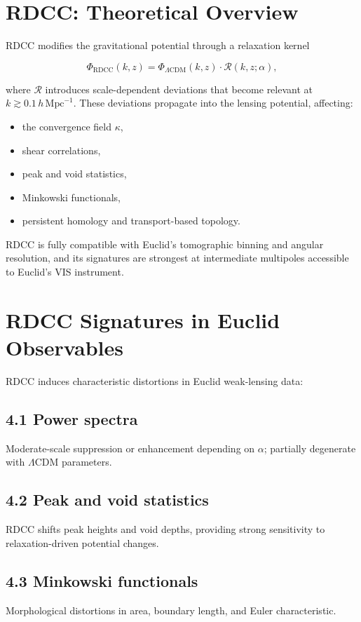 \documentclass[11pt,a4paper]{article}
\begin{document}
\section{RDCC: Theoretical Overview}

RDCC modifies the gravitational potential through a relaxation kernel


\[
    \Phi_{\mathrm{RDCC}}(k,z)
    =
    \Phi_{\Lambda\mathrm{CDM}}(k,z)
    \cdot
    \mathcal{R}(k,z;\alpha),
\]


where $\mathcal{R}$ introduces scale-dependent deviations that become relevant 
at $k \gtrsim 0.1\,h\,\mathrm{Mpc}^{-1}$. These deviations propagate into the 
lensing potential, affecting:

\begin{itemize}
    \item the convergence field $\kappa$,
    \item shear correlations,
    \item peak and void statistics,
    \item Minkowski functionals,
    \item persistent homology and transport-based topology.
\end{itemize}

RDCC is fully compatible with Euclid's tomographic binning and angular 
resolution, and its signatures are strongest at intermediate multipoles 
accessible to Euclid's VIS instrument.
\section{RDCC Signatures in Euclid Observables}

RDCC induces characteristic distortions in Euclid weak-lensing data:

\subsection*{4.1 Power spectra}
Moderate-scale suppression or enhancement depending on $\alpha$; partially 
degenerate with $\Lambda$CDM parameters.

\subsection*{4.2 Peak and void statistics}
RDCC shifts peak heights and void depths, providing strong sensitivity to 
relaxation-driven potential changes.

\subsection*{4.3 Minkowski functionals}
Morphological distortions in area, boundary length, and Euler characteristic.
\end{document}
